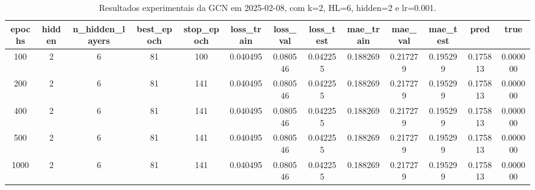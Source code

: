\begin{table}[h]
\centering
\caption{Resultados experimentais da GCN em 2025-02-08, com k=2, HL=6, hidden=2 e lr=0.001.}
\label{tab:gcn_results_k2_hl6_h2_d20250208}
\begin{tabular}{ccccccccccccc}
\toprule
epochs & hidden & n\_hidden\_layers & best\_epoch & stop\_epoch & loss\_train & loss\_val & loss\_test & mae\_train & mae\_val & mae\_test & pred & true \\
\midrule
100 & 2 & 6 & 81 & 100 & 0.040495 & 0.080546 & 0.042255 & 0.188269 & 0.217279 & 0.195299 & 0.175813 & 0.000000 \\
200 & 2 & 6 & 81 & 141 & 0.040495 & 0.080546 & 0.042255 & 0.188269 & 0.217279 & 0.195299 & 0.175813 & 0.000000 \\
400 & 2 & 6 & 81 & 141 & 0.040495 & 0.080546 & 0.042255 & 0.188269 & 0.217279 & 0.195299 & 0.175813 & 0.000000 \\
500 & 2 & 6 & 81 & 141 & 0.040495 & 0.080546 & 0.042255 & 0.188269 & 0.217279 & 0.195299 & 0.175813 & 0.000000 \\
1000 & 2 & 6 & 81 & 141 & 0.040495 & 0.080546 & 0.042255 & 0.188269 & 0.217279 & 0.195299 & 0.175813 & 0.000000 \\
\bottomrule
\end{tabular}
\end{table}
